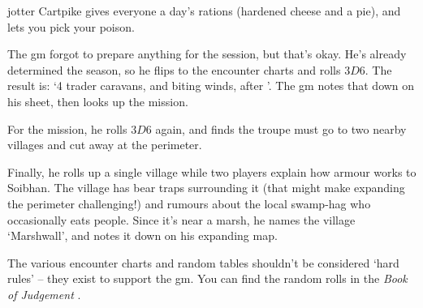 \begin{multicols}{2}
{\begin{description}
    \Gls{jotter} Cartpike gives everyone a day's rations (hardened cheese and a pie), and lets you pick your poison.
  \end{description}

}{
  The \gls{gm} forgot to prepare anything for the session, but that's okay.
  He's already determined the season, so he flips to the encounter charts and rolls $3D6$.
  The result is: `4 trader caravans, and biting winds, after '.
  The \gls{gm} notes that down on his sheet, then looks up the mission.

  For the mission, he rolls $3D6$ again, and finds the troupe must go to two nearby \glspl{village} and cut away at the perimeter.

  Finally, he rolls up a single \gls{village} while two players explain how armour works to Soibhan.
  The \gls{village} has bear traps surrounding it (that might make expanding the perimeter challenging!) and rumours about the local swamp-hag who occasionally eats people.
  Since it's near a marsh, he names the \gls{village} `Marshwall', and notes it down on his expanding map.

  The various encounter charts and random tables shouldn't be considered `hard rules' -- they exist to support the \gls{gm}.
  You can find the random rolls in the \textit{Book of Judgement}%
  \iftoggle{judgement}{, \autoref{encounters}, \autopageref{encounters}}{}.
}


\end{multicols}
